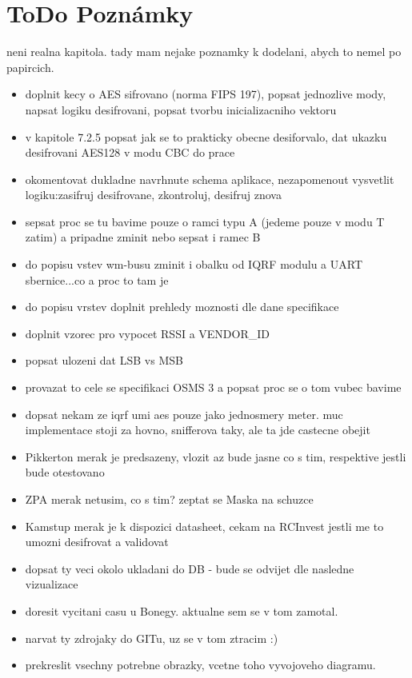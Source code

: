 \chapter{ToDo Poznámky}

\colorbox[rgb]{0,1,0}{neni realna kapitola. tady mam nejake poznamky k dodelani, abych to nemel po papircich.}

\begin{itemize}
	\item doplnit kecy o AES sifrovano (norma FIPS 197), popsat jednozlive mody, napsat logiku desifrovani, popsat tvorbu inicializacniho vektoru
	\item v kapitole 7.2.5 popsat jak se to prakticky obecne desiforvalo, dat ukazku desifrovani AES128 v modu CBC do prace
	\item okomentovat dukladne navrhnute schema aplikace, nezapomenout vysvetlit logiku:zasifruj desifrovane, zkontroluj, desifruj znova
	\item sepsat proc se tu bavime pouze o ramci typu A (jedeme pouze v modu T zatim) a pripadne zminit nebo sepsat i ramec B
	\item do popisu vstev wm-busu zminit i obalku od IQRF modulu a UART sbernice...co a proc to tam je
	\item do popisu vrstev doplnit prehledy moznosti dle dane specifikace
	\item doplnit vzorec pro vypocet RSSI a VENDOR\_ID
	\item popsat ulozeni dat LSB vs MSB
	\item provazat to cele se specifikaci OSMS 3 a popsat proc se o tom vubec bavime
	\item dopsat nekam ze iqrf umi aes pouze jako jednosmery meter. muc implementace stoji za hovno, snifferova taky, ale ta jde castecne obejit
	\item Pikkerton merak je predsazeny, vlozit az bude jasne co s tim, respektive jestli bude otestovano
	\item ZPA merak netusim, co s tim? zeptat se Maska na schuzce
	\item Kamstup merak je k dispozici datasheet, cekam na RCInvest jestli me to umozni desifrovat a validovat
	\item dopsat ty veci okolo ukladani do DB - bude se odvijet dle nasledne vizualizace
	\item doresit vycitani casu u Bonegy. aktualne sem se v tom zamotal.
	\item narvat ty zdrojaky do GITu, uz se v tom ztracim :)
	\item prekreslit vsechny potrebne obrazky, vcetne toho vyvojoveho diagramu. 

\end{itemize}
